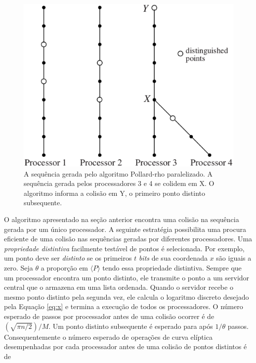 \begin{figure}[h]
\centering
\includegraphics[scale=0.4, bb=0 0 737 604]{figuras/paralellized.eps}
\caption{A sequência gerada pelo algoritmo Pollard-rho paralelizado. A sequência gerada pelos processadores 3 e 4 se colidem em X. O algoritmo informa a colisão em Y, o primeiro ponto distinto subsequente.}
\label{fig:paralellized}
\end{figure}

O algoritmo apresentado na seção anterior encontra uma colisão na sequência gerada por um único processador. A seguinte estratégia possibilita uma procura eficiente de uma colisão nas sequências geradas por diferentes processadores. Uma \textit{propriedade distintiva} facilmente testável de pontos é selecionada. Por exemplo, um ponto deve ser \textit{distinto} se os primeiros \(t\) \textit{bits} de sua coordenada \(x\) são iguais a zero. Seja \(\theta\) a proporção em $\langle P \rangle$ tendo essa propriedade distintiva. Sempre que um processador encontra um ponto distinto, ele transmite o ponto a um servidor central que o armazena em uma lista ordenada. Quando o servidor recebe o mesmo ponto distinto pela segunda vez, ele calcula o logaritmo discreto desejado pela Equação \ref{eq:x} e termina a execução de todos os processadores. O número esperado de passos por processador antes de uma colisão ocorrer é de $(\sqrt{\pi n/2})/M$. Um ponto distinto subsequente é esperado para após $1/\theta$ passos. Consequentemente o número esperado de operações de curva elíptica desempenhadas por cada processador antes de uma colisão de pontos distintos é de

